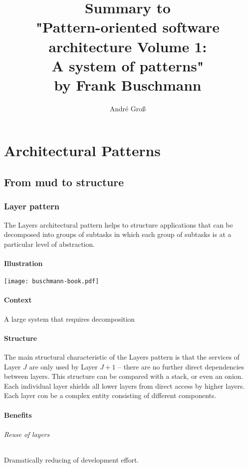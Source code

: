 \documentclass[a4paper,11pt,twocolumn]{report}
\title{Summary to\\"Pattern-oriented software architecture Volume 1:\\
    A system of patterns"\\by Frank Buschmann}
\author{André Groß}
\begin{document}
    \maketitle
    \tableofcontents
    
    \part{Architectural Patterns}
    \chapter{From mud to structure}
    
    \section{Layer pattern}
    The Layers architectural pattern helps to structure applications that can
    be decomposed into groups of subtasks in which each group of subtasks is at
    a particular level of abstraction.
    \subsection{Illustration}
    \texttt{[image: buschmann-book.pdf]}
    \subsection{Context}
    A large system that requires decomposition
    \subsection{Structure}
    The main structural characteristic of the Layers pattern is that the
    services of Layer $J$ are only used by Layer $J+1$ -- there are no further
    direct dependencies between layers. This structure can be compared with a
    stack, or even an onion. Each individual layer shields all lower layers
    from direct access by higher layers. Each layer con be a complex entity
    consisting of different components.
    \subsection{Benefits}
    \paragraph{Reuse of layers}
    Dramatically reducing of development effort.
\end{document}
